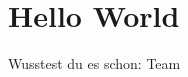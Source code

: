 \documentclass[
    load-dhbw-templates,      %
    add-tocs-to-toc,          %
    debug,                    %
    language = ngerman,       %
    auto-intro-pages = custom %
]{iodhbwm}
\begin{document}
    \chapter{Hello World}
        Wusstest du es schon: \ac{Team}
        
    \Blinddocument
\end{document}
